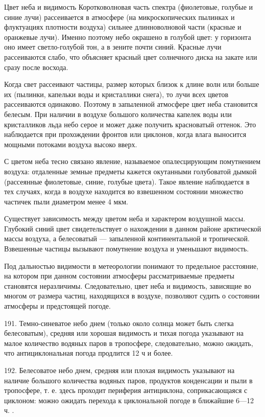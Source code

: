 Цвет неба и видимость
Коротковолновая часть спектра (фиолетовые, голубые и синие лучи) рассеивается в атмосфере (на микроскопических пылинках и флуктуациях плотности воздуха) сильнее длинноволновой части (красные и оранжевые лучи). Именно поэтому небо окрашено в голубой цвет: у горизонта оно имеет светло-голубой тон, а в зените почти синий. Красные лучи рассеиваются слабо, что объясняет красный цвет солнечного диска на закате или сразу после восхода.

Когда свет рассеивают частицы, размер которых близок к длине волн или больше их (пылинки, капельки воды и кристаллики снега), то лучи всех цветов рассеиваются одинаково. Поэтому в запыленной атмосфере цвет неба становится белесым. При наличии в воздухе большого количества капелек воды или кристалликов льда небо серое и может даже получить красноватый оттенок. Это наблюдается при прохождении фронтов или циклонов, когда влага выносится мощными потоками воздуха высоко вверх.

С цветом неба тесно связано явление, называемое опалесцирующим помутнением воздуха: отдаленные земные предметы кажется окутанными голубоватой дымкой (рассеянные фиолетовые, синие, голубые цвета). Такое явление наблюдается в тех случаях, когда в воздухе находится во взвешенном состоянии множество частичек пыли диаметром менее 4 мкм.

Существует зависимость между цветом неба и характером воздушной массы. Глубокий синий цвет свидетельствует о нахождении в данном районе арктической массы воздуха, а белесоватый — запыленной континентальной и тропической. Взвешенные частицы вызывают помутнение воздуха и уменьшают видимость.

Под дальностью видимости в метеорологии понимают то предельное расстояние, на котором при данном состоянии атмосферы рассматриваемые предметы становятся неразличимы. Следовательно, цвет неба и видимость, зависящие во многом от размера частиц, находящихся в воздухе, позволяют судить о состоянии атмосферы и предстоящей погоде.

191. Темно-синеватое небо днем (только около солнца может быть слегка белесоватым), средняя или хорошая видимость и тихая погода указывают на малое количество водяных паров в тропосфере, следовательно, можно ожидать, что антициклональная погода продлится 12 ч и более.

192. Белесоватое небо днем, средняя или плохая видимость указывают на наличие большого количества водяных паров, продуктов конденсации и пыли в тропосфере, т. е. здесь проходит периферия антициклона, соприкасающаяся с циклоном: можно ожидать перехода к циклональной погоде в ближайшие 6—12 ч. .

